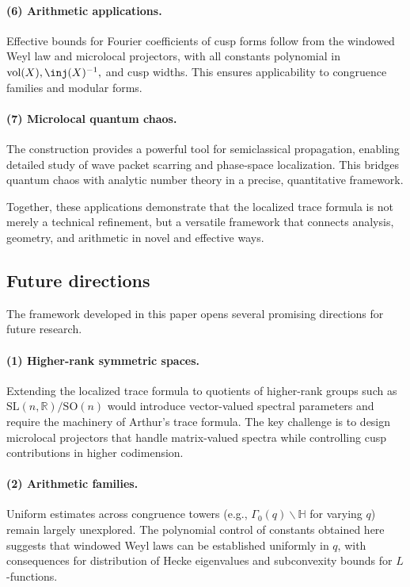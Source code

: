 \paragraph{(6) Arithmetic applications.}
Effective bounds for Fourier coefficients of cusp forms follow from the windowed Weyl law
and microlocal projectors, with all constants polynomial in $\vol(X),\inj(X)^{-1},$
and cusp widths. This ensures applicability to congruence families and modular forms.

\paragraph{(7) Microlocal quantum chaos.}
The construction provides a powerful tool for semiclassical propagation, enabling detailed
study of wave packet scarring and phase-space localization. This bridges quantum chaos
with analytic number theory in a precise, quantitative framework.

\medskip
Together, these applications demonstrate that the localized trace formula is not merely a
technical refinement, but a versatile framework that connects analysis, geometry, and
arithmetic in novel and effective ways.

\subsection{Future directions}\label{subsec:future}

The framework developed in this paper opens several promising directions for future
research.

\paragraph{(1) Higher-rank symmetric spaces.}
Extending the localized trace formula to quotients of higher-rank groups such as
$\mathrm{SL}(n,\mathbb{R})/\mathrm{SO}(n)$ would introduce vector-valued spectral
parameters and require the machinery of Arthur’s trace formula. The key challenge is to
design microlocal projectors that handle matrix-valued spectra while controlling cusp
contributions in higher codimension.

\paragraph{(2) Arithmetic families.}
Uniform estimates across congruence towers (e.g., $\Gamma_0(q)\backslash\mathbb{H}$ for
varying $q$) remain largely unexplored. The polynomial control of constants obtained here
suggests that windowed Weyl laws can be established uniformly in $q$, with consequences
for distribution of Hecke eigenvalues and subconvexity bounds for $L$-functions.

